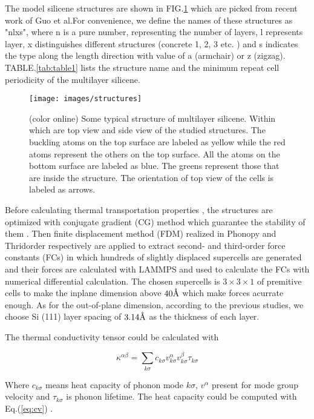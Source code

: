 \documentclass[%
 reprint,
 amsmath,amssymb,
 aps,
 prb,
]{revtex4-1}
\newcommand{\angstrom}{\mbox{\normalfont\AA}}
\begin{document}
The model silicene structures are shown in FIG.\ref{fig:structures} which are picked from recent work of Guo et al\cite{Guo2015Structural}.For convenience, we define the names of these structures as "nlxs", where n is a pure number, representing the number of layers, l represents layer, x distinguishes different structures (concrete 1, 2, 3 etc. ) and s indicates the type along the length direction with value of a (armchair) or z (zigzag). TABLE.\ref{tab:table1} lists the structure name and  the minimum repeat cell periodicity of the multilayer silicene.

\begin{figure}[b]
  \texttt{[image: images/structures]}
  \caption{\label{fig:structures}  (color online) Some typical structure of multilayer silicene. Within which  are top view and side view of the studied structures. The buckling atoms on the top surface are labeled as yellow while the red atoms represent the others on the top surface. All the atoms on the bottom surface are labeled as blue. The greens represent those that are inside the structure. The orientation of top view of the cells is labeled as arrows.}
\end{figure}

Before calculating thermal transportation properties , the  structures are  optimized with  conjugate gradient (CG) method which guarantee the stability of them .  Then finite displacement method (FDM) realized in Phonopy\cite{Togo2008} and Thridorder respectively are applied to extract second- and third-order force constants (FCs) in which hundreds of  slightly displaced supercells are generated and their forces are calculated with LAMMPS and used to calculate the FCs with  numerical differential calculation. The chosen supercells is $3 \times 3 \times 1$ of premitive cells to make the inplane dimension above  $40\angstrom$ which make  forces acurrate enough. As for the out-of-plane dimension, according to the previous studies, we choose Si (111) layer spacing of $3.14 \angstrom$ as the thickness of each layer.

The thermal conductivity tensor could be calculated with

\begin{equation}
  \kappa^{\alpha\beta} = \sum_{k \sigma}{c_{k \sigma}v^{\alpha}_{k \sigma}v^{\beta}_{k \sigma}\tau_{k \sigma}} \label{eq:kappasum}
\end{equation}

Where $c_{k \sigma}$ means heat capacity of phonon mode $k \sigma$, $v^{\alpha}$ present for mode group velocity and $\tau_{k \sigma}$ is phonon lifetime. The heat capacity  could be computed with Eq.(\ref{eq:cv}) .
\end{document}

